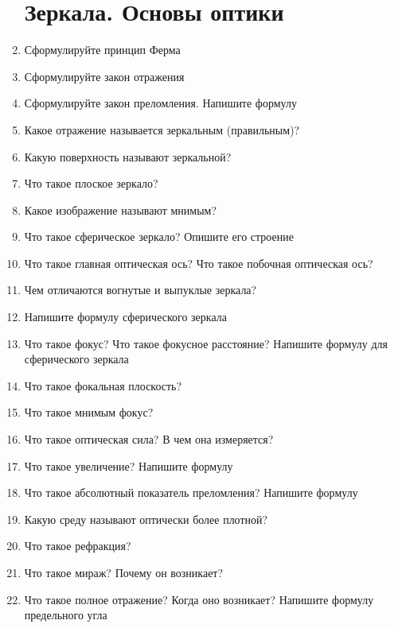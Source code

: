 \documentclass[12pt,a4paper]{report}
\begin{document}
\begin{enumerate}
\section{Зеркала. Основы оптики}
\item Сформулируйте принцип Ферма
\item Сформулируйте закон отражения
\item Сформулируйте закон преломления. Напишите формулу
\item Какое отражение называется зеркальным (правильным)?
\item Какую поверхность называют зеркальной?
\item Что такое плоское зеркало?
\item Какое изображение называют мнимым?
\item Что такое сферическое зеркало? Опишите его строение
\item Что такое главная оптическая ось? Что такое побочная оптическая ось?
\item Чем отличаются вогнутые и выпуклые зеркала?
\item Напишите формулу сферического зеркала
\item Что такое фокус? Что такое фокусное расстояние? Напишите формулу для сферического зеркала
\item Что такое фокальная плоскость?
\item Что такое мнимым фокус?
\item Что такое оптическая сила? В чем она измеряется?
\item Что такое увеличение? Напишите формулу
\item Что такое абсолютный показатель преломления? Напишите формулу
\item Какую среду называют оптически более плотной?
\item Что такое рефракция?
\item Что такое мираж? Почему он возникает?
\item Что такое полное отражение? Когда оно возникает? Напишите формулу предельного угла


\end{enumerate}
\end{document}
